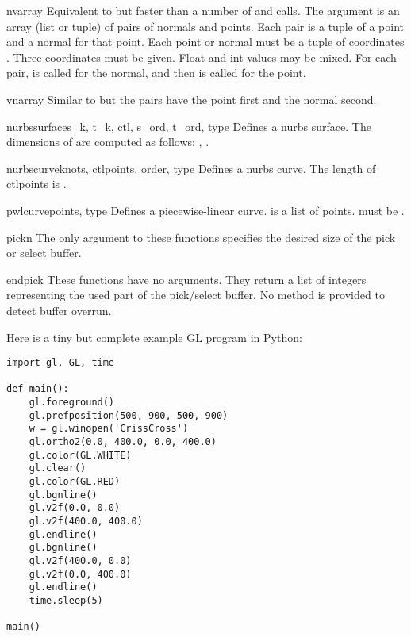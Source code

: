 \begin{funcdesc}{nvarray}{}
Equivalent to but faster than a number of
and
calls.
The argument is an array (list or tuple) of pairs of normals and points.
Each pair is a tuple of a point and a normal for that point.
Each point or normal must be a tuple of coordinates
.
Three coordinates must be given.
Float and int values may be mixed.
For each pair,
is called for the normal, and then
is called for the point.
\end{funcdesc}

\begin{funcdesc}{vnarray}{}
Similar to 
but the pairs have the point first and the normal second.
\end{funcdesc}

\begin{funcdesc}{nurbssurface}{s_k, t_k, ctl, s_ord, t_ord, type}
Defines a nurbs surface.
The dimensions of
are computed as follows:
,
.
\end{funcdesc}

\begin{funcdesc}{nurbscurve}{knots, ctlpoints, order, type}
Defines a nurbs curve.
The length of ctlpoints is
.
\end{funcdesc}

\begin{funcdesc}{pwlcurve}{points, type}
Defines a piecewise-linear curve.
is a list of points.
must be
.
\end{funcdesc}

\begin{funcdesc}{pick}{n}
The only argument to these functions specifies the desired size of the
pick or select buffer.
\end{funcdesc}

\begin{funcdesc}{endpick}{}
These functions have no arguments.
They return a list of integers representing the used part of the
pick/select buffer.
No method is provided to detect buffer overrun.
\end{funcdesc}

Here is a tiny but complete example GL program in Python:

\begin{verbatim}
import gl, GL, time

def main():
    gl.foreground()
    gl.prefposition(500, 900, 500, 900)
    w = gl.winopen('CrissCross')
    gl.ortho2(0.0, 400.0, 0.0, 400.0)
    gl.color(GL.WHITE)
    gl.clear()
    gl.color(GL.RED)
    gl.bgnline()
    gl.v2f(0.0, 0.0)
    gl.v2f(400.0, 400.0)
    gl.endline()
    gl.bgnline()
    gl.v2f(400.0, 0.0)
    gl.v2f(0.0, 400.0)
    gl.endline()
    time.sleep(5)

main()
\end{verbatim}


